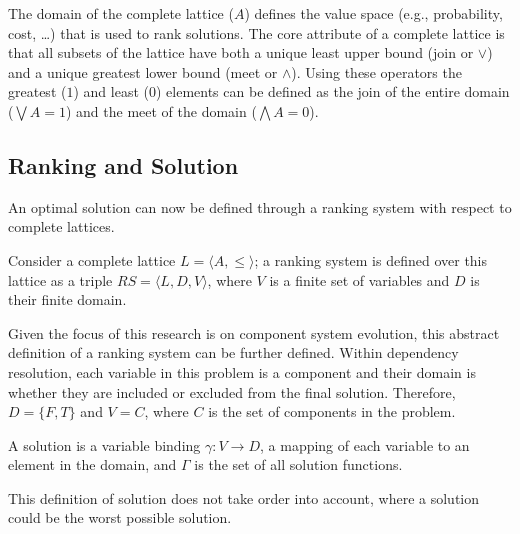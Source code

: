 The domain of the complete lattice ($A$) defines the value space (e.g., probability, cost, \ldots) 
that is used to rank solutions. 
The core attribute of a complete lattice is that all subsets of the lattice have both a unique least upper bound (join or $\vee$) 
and a unique greatest lower bound (meet or $\wedge$).
Using these operators the greatest ($1$) and least ($0$) elements can be defined as
the join of the entire domain ($\bigvee A = 1$) and the meet of the domain ($\bigwedge A = 0$).

\subsection{Ranking and Solution}
An optimal solution can now be defined through a ranking system with respect to complete lattices.

\begin{defs}
Consider a complete lattice $L = \langle A, \leq \rangle$; 
a ranking system is defined over this lattice as a triple $RS = \langle L, D, V \rangle$, 
where $V$ is a finite set of variables and $D$ is their finite domain.
\end{defs}

Given the focus of this research is on component system evolution,
this abstract definition of a ranking system can be further defined.
Within dependency resolution, 
each variable in this problem is a component and their domain is whether they are included or excluded from the final solution.
Therefore, $D = \{F,T\}$ and $V = C$, where $C$ is the set of components in the problem.

\begin{defs}
A solution is a variable binding $\gamma: V \rightarrow D$, a mapping of each variable to an element in the domain,
and $\Gamma$ is the set of all solution functions.
\end{defs}

This definition of solution does not take order into account, where a solution could be the worst possible solution.

